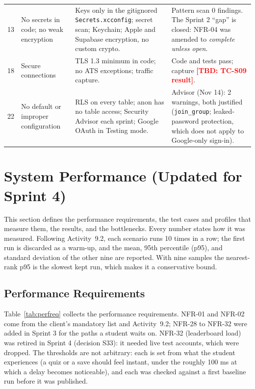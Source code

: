 \documentclass[12pt,letterpaper]{article}
\newcommand{\tbd}[1]{\textcolor{red}{\textbf{[TBD: #1]}}}
\begin{document}
\begin{xltabular}{\textwidth}{@{}l L{2.5cm} Y L{4.2cm}@{}}
13 & No secrets in code; no weak encryption & Keys only in the gitignored \texttt{Secrets.xcconfig}; secret scan; Keychain; Apple and Supabase encryption, no custom crypto. & Pattern scan 0 findings. The Sprint 2 ``gap'' is closed: NFR-04 was amended to \emph{complete unless open}. \\
18 & Secure connections & TLS 1.3 minimum in code; no ATS exceptions; traffic capture. & Code and tests pass; capture \tbd{TC-S09 result}. \\
22 & No default or improper configuration & RLS on every table; anon has no table access; Security Advisor each sprint; Google OAuth in Testing mode. & Advisor (Nov 14): 2 warnings, both justified (\texttt{join\_group}; leaked-password protection, which does not apply to Google-only sign-in). \\
\end{xltabular}

\section{System Performance (Updated for Sprint 4)}\label{sec:performance}
This section defines the performance requirements, the test cases and profiles that
measure them, the results, and the bottlenecks. Every number states how it was
measured. Following Activity~9.2, each scenario runs 10 times in a row; the first run
is discarded as a warm-up, and the mean, 95th percentile (p95), and standard deviation
of the other nine are reported. With nine samples the nearest-rank p95 is the slowest
kept run, which makes it a conservative bound.

\subsection{Performance Requirements}
Table~\ref{tab:perfreq} collects the performance requirements. NFR-01 and NFR-02 come
from the client's mandatory list and Activity~9.2; NFR-28 to NFR-32 were added in
Sprint 3 for the paths a student waits on. NFR-32 (leaderboard load) was retired in Sprint 4
(decision S33): it needed live test accounts, which were dropped. The thresholds are not arbitrary: each is
set from what the student experiences (a quiz or a save should feel instant, under
the roughly 100 ms at which a delay becomes noticeable), and each was checked against a
first baseline run before it was published.
\end{document}
